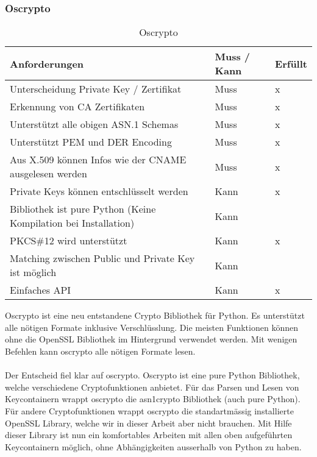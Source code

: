 \subsubsection{Oscrypto \cite{oscrypto}}
\begin{table}[H]
\centering
    \begin{tabular}{|p{12cm}|l|l|}
    \hline
    \rowcolor{lightblue}
    Anforderungen & Muss / Kann & Erfüllt   \\ \hline
	Unterscheidung Private Key / Zertifikat	&	Muss & x \\ \hline	
	Erkennung von CA Zertifikaten	&	Muss	& x \\ \hline	
	Unterstützt alle obigen ASN.1 Schemas	&	Muss	& x \\ \hline		
	Unterstützt PEM und DER Encoding	&	Muss	&  x \\ \hline	
	Aus X.509 können Infos wie der CNAME ausgelesen werden &	Muss	& x \\ \hline	
	Private Keys können entschlüsselt werden &	Kann &  x \\ \hline
	Bibliothek ist pure Python (Keine Kompilation bei Installation) &	Kann	&  ~ \\ \hline
	PKCS\#12 wird unterstützt &	Kann & x \\ \hline
	Matching zwischen Public und Private Key ist möglich &	Kann & ~  \\ \hline
	Einfaches API &	Kann & x \\ \hline
	\end{tabular}
    \caption[Oscrypto]{Oscrypto}
\end{table}
\medskip
Oscrypto ist eine neu entstandene Crypto Bibliothek für Python. Es unterstützt alle nötigen Formate inklusive Verschlüsslung. Die meisten Funktionen können ohne die OpenSSL Bibliothek im Hintergrund verwendet werden. Mit wenigen Befehlen kann oscrypto alle nötigen Formate lesen.\\\\

Der Entscheid fiel klar auf oscrypto. Oscrypto ist eine pure Python Bibliothek, welche verschiedene Cryptofunktionen anbietet. Für das Parsen und Lesen von Keycontainern wrappt oscrypto die asn1crypto Bibliothek (auch pure Python). Für andere Cryptofunktionen wrappt oscrypto die standartmässig installierte OpenSSL Library, welche wir in dieser Arbeit aber nicht brauchen.
Mit Hilfe dieser Library ist nun ein komfortables Arbeiten mit allen oben aufgeführten Keycontainern möglich, ohne Abhängigkeiten ausserhalb von Python zu haben.